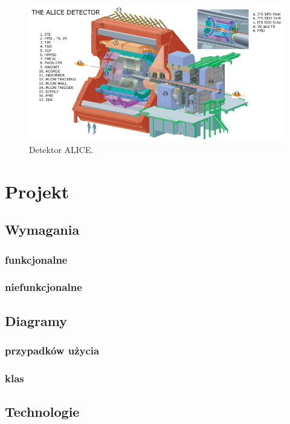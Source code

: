 \begin{figure}[H]
		\centering
 		\includegraphics[width=15.5cm]{detector.png}
    	\caption{Detektor ALICE.}
 		\label{rys9}
\end{figure}
\newpage
\section{Projekt}
\subsection{Wymagania}
\subsubsection{funkcjonalne}
\subsubsection{niefunkcjonalne}

\subsection{Diagramy}
\subsubsection{przypadków użycia}
\subsubsection{klas}

\newpage
\subsection{Technologie}
